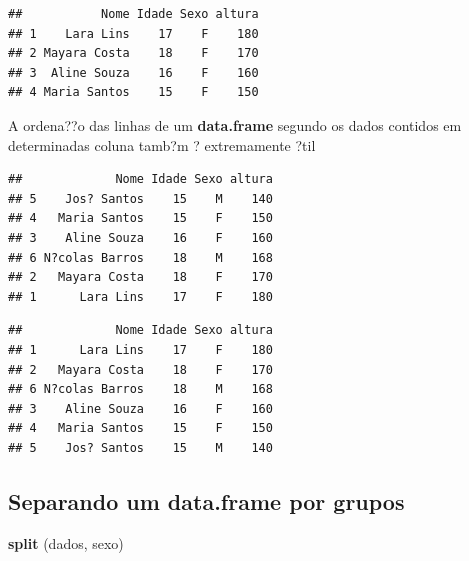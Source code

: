 \documentclass[]{book}
\newenvironment{Shaded}{\begin{snugshade}}{\end{snugshade}}
\newcommand{\KeywordTok}[1]{\textcolor[rgb]{0.13,0.29,0.53}{\textbf{#1}}}
\newcommand{\NormalTok}[1]{#1}
\newcommand{\OperatorTok}[1]{\textcolor[rgb]{0.81,0.36,0.00}{\textbf{#1}}}
\begin{document}
\begin{verbatim}
##           Nome Idade Sexo altura
## 1    Lara Lins    17    F    180
## 2 Mayara Costa    18    F    170
## 3  Aline Souza    16    F    160
## 4 Maria Santos    15    F    150
\end{verbatim}

A ordena??o das linhas de um \textbf{data.frame} segundo os dados contidos em determinadas coluna tamb?m ? extremamente ?til

\begin{Shaded}
\end{Shaded}

\begin{verbatim}
##             Nome Idade Sexo altura
## 5    Jos? Santos    15    M    140
## 4   Maria Santos    15    F    150
## 3    Aline Souza    16    F    160
## 6 N?colas Barros    18    M    168
## 2   Mayara Costa    18    F    170
## 1      Lara Lins    17    F    180
\end{verbatim}

\begin{Shaded}
\end{Shaded}

\begin{verbatim}
##             Nome Idade Sexo altura
## 1      Lara Lins    17    F    180
## 2   Mayara Costa    18    F    170
## 6 N?colas Barros    18    M    168
## 3    Aline Souza    16    F    160
## 4   Maria Santos    15    F    150
## 5    Jos? Santos    15    M    140
\end{verbatim}

\hypertarget{separando-um-data.frame-por-grupos}{%
\subsection{Separando um data.frame por grupos}\label{separando-um-data.frame-por-grupos}}

\begin{Shaded}
\begin{Highlighting}[]
\KeywordTok{split}\NormalTok{ (dados, sexo)}
\end{Highlighting}
\end{Shaded}
\end{document}
